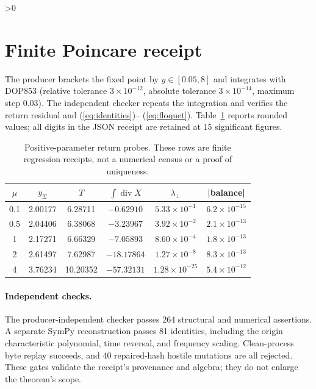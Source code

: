\documentclass[10pt]{article}
\begin{document}
\ifnum\CRevisionRound>0
\section{Finite Poincare receipt}
The producer brackets the fixed point by \(y\in[0.05,8]\) and integrates
with DOP853 (relative tolerance \(3\times10^{-12}\), absolute tolerance
\(3\times10^{-14}\), maximum step \(0.03\)).  The independent checker repeats
the integration and verifies the return residual and (\ref{eq:identities})--
(\ref{eq:floquet}).  Table~\ref{tab:receipt} reports rounded values; all
digits in the JSON receipt are retained at 15 significant figures.
\begin{table}[t]
\centering\small
\setlength{\tabcolsep}{4pt}
\caption{Positive-parameter return probes.  These rows are finite regression
receipts, not a numerical census or a proof of uniqueness.}
\label{tab:receipt}
\begin{tabular}{c|c|c|c|c|c}
\toprule
\(\mu\) & \(y_\Sigma\) & \(T\) & \(\int\!\operatorname{div}X\) & \(\lambda_\perp\) & |balance|\\
\midrule
0.1 & 2.00177 & 6.28711 & $-0.62910$ & $5.33\times10^{-1}$ & $6.2\times10^{-15}$\\
0.5 & 2.04406 & 6.38068 & $-3.23967$ & $3.92\times10^{-2}$ & $2.1\times10^{-13}$\\
1   & 2.17271 & 6.66329 & $-7.05893$ & $8.60\times10^{-4}$ & $1.8\times10^{-13}$\\
2   & 2.61497 & 7.62987 & $-18.17864$ & $1.27\times10^{-8}$ & $8.3\times10^{-13}$\\
4   & 3.76234 & 10.20352 & $-57.32131$ & $1.28\times10^{-25}$ & $5.4\times10^{-12}$\\
\bottomrule
\end{tabular}
\end{table}
\fi

\ifnum{}
\paragraph{Independent checks.}
The producer-independent checker passes 264 structural and numerical
assertions.  A separate SymPy reconstruction passes 81 identities, including
the origin characteristic polynomial, time reversal, and frequency scaling.
Clean-process byte replay succeeds, and 40 repaired-hash hostile mutations
are all rejected.  These gates validate the receipt's provenance and algebra;
they do not enlarge the theorem's scope.
\fi
\end{document}
